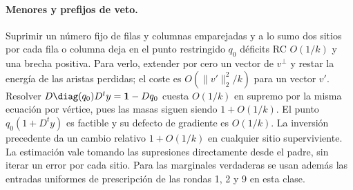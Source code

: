 \paragraph{Menores y prefijos de veto.}
Suprimir un número fijo de filas y columnas emparejadas y a lo sumo dos sitios por
cada fila o columna deja en el punto restringido $q_0$ déficits RC $O(1/k)$ y una
brecha positiva. Para verlo, extender por cero un vector de $v^\perp$ y restar la
energía de las aristas perdidas; el coste es $O(\|v'\|_2^2/k)$ para un vector $v'$.
Resolver $D\diag(q_0)D^t y=\mathbf1-Dq_0$ cuesta $O(1/k)$ en supremo por la misma
ecuación por vértice, pues las masas siguen siendo $1+O(1/k)$. El punto
$q_0(1+D^ty)$ es factible y su defecto de gradiente es $O(1/k)$.
La inversión precedente da un cambio relativo $1+O(1/k)$ en cualquier sitio superviviente.
La estimación vale tomando las supresiones directamente desde el padre, sin iterar
un error por cada sitio. Para las marginales verdaderas se usan además las entradas
uniformes de prescripción de las rondas 1, 2 y 9 en esta clase.
